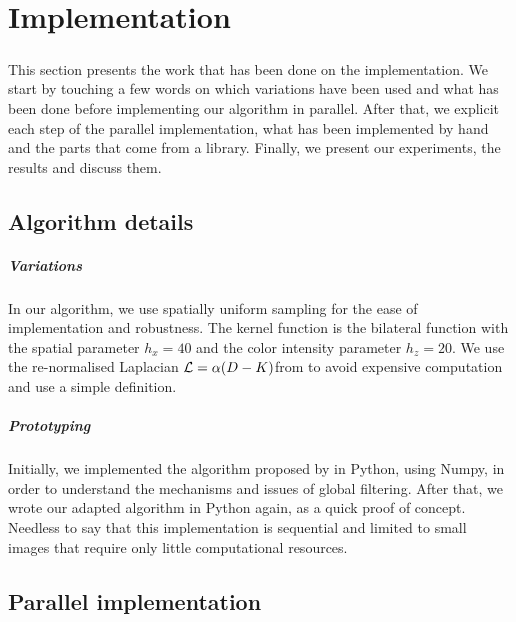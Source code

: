 \chapter{Implementation}

\paragraph{}
This section presents the work that has been done on the implementation.
We start by touching a few words on which variations have been used and what has been done before implementing our algorithm in parallel.
After that, we explicit each step of the parallel implementation, what has been implemented by hand and the parts that come from a library.
Finally, we present our experiments, the results and discuss them.

\section{Algorithm details}

\paragraph{Variations}
In our algorithm, we use spatially uniform sampling for the ease of implementation and robustness.
The kernel function is the bilateral function with the spatial parameter \(h_x = 40\) and the color intensity parameter \(h_z = 20\).
We use the re-normalised Laplacian \(\operatorname{\mathcal{L}} = \alpha (D-K)\)from \cite{milanfar_new_2016} to avoid expensive computation and use a simple definition.

\paragraph{Prototyping}
Initially, we implemented the algorithm proposed by \cite{glide_2014} in Python, using Numpy, in order to understand the mechanisms and issues of global filtering.
After that, we wrote our adapted algorithm in Python again, as a quick proof of concept.
Needless to say that this implementation is sequential and limited to small images that require only little computational resources.

\section{Parallel implementation}

